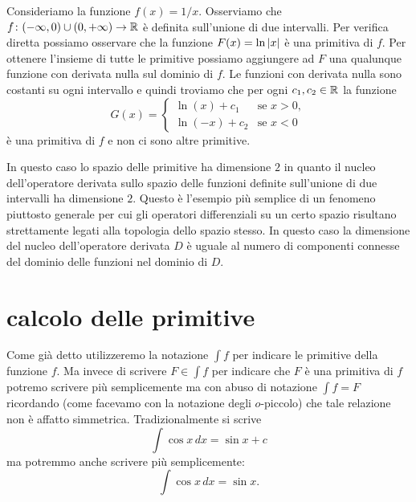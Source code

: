 \begin{example}
\label{ex:primitive_non_connesso}%
\mymark{*}%
Consideriamo la funzione $f(x) = 1/x$. Osserviamo che
$f\colon (-\infty, 0) \cup (0,+\infty)\to {\mathbb R}$ è definita sull'unione di due
intervalli. Per verifica diretta possiamo osservare che la funzione
$F(x) = \ln {\left|x\right|}$ è una primitiva di $f$. Per ottenere l'insieme di tutte
le primitive possiamo aggiungere ad $F$ una qualunque funzione con derivata
nulla sul dominio di $f$. Le funzioni con derivata nulla sono costanti su ogni
intervallo e quindi troviamo che per ogni $c_1, c_2\in {\mathbb R}$ la funzione
\[
G(x) =
\begin{cases}
  \ln (x) + c_1 &\text{se $x>0$},\\
  \ln (-x) + c_2 & \text{se $x<0$}
\end{cases}
\]
è una primitiva di $f$ e non ci sono altre primitive.

In questo caso lo spazio delle primitive ha dimensione $2$ in quanto il nucleo
dell'operatore derivata sullo spazio delle funzioni definite sull'unione di
due intervalli ha dimensione $2$.
Questo è l'esempio più semplice di un fenomeno piuttosto generale per cui gli
operatori differenziali su un certo spazio risultano strettamente legati alla
topologia dello spazio stesso. In questo caso la dimensione del nucleo
dell'operatore derivata $D$ è uguale al numero di componenti connesse del
dominio delle funzioni nel dominio di $D$.
\end{example}

\section{calcolo delle primitive}

Come già detto utilizzeremo la notazione $\int f$ per indicare le primitive
della funzione $f$.
Ma invece di scrivere $F\in \int f$
per indicare che $F$ è una primitiva di $f$
potremo scrivere
più semplicemente ma con abuso di notazione $\int f = F$
ricordando (come facevamo con la notazione degli $o$-piccolo) che tale relazione
non è affatto simmetrica.
Tradizionalmente si scrive
\begin{equation}\label{eq:4137878}
  \int \cos x\, dx = \sin x + c 
\end{equation}
ma potremmo anche scrivere più semplicemente:
\begin{equation}\label{eq:489417}
  \int \cos x\, dx = \sin x.
\end{equation}

